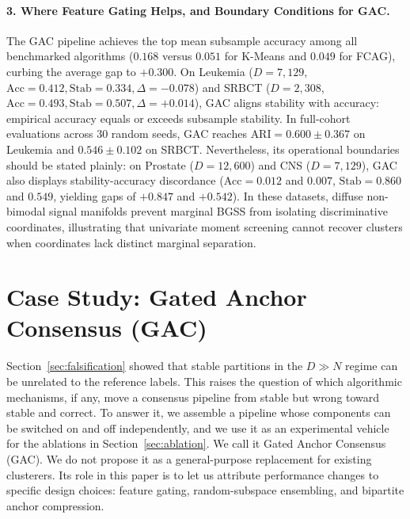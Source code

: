\documentclass[pdflatex,sn-mathphys-num]{sn-jnl}
\theoremstyle{thmstyleone}
\theoremstyle{thmstyletwo}
\theoremstyle{thmstylethree}
\begin{document}
\paragraph{3. Where Feature Gating Helps, and Boundary Conditions for GAC.}
The GAC pipeline achieves the top mean subsample accuracy among all benchmarked algorithms ($0.168$ versus $0.051$ for K-Means and $0.049$ for FCAG), curbing the average gap to $+0.300$. On Leukemia ($D=7{,}129$, $\text{Acc} = 0.412, \text{Stab} = 0.334, \Delta = -0.078$) and SRBCT ($D=2{,}308$, $\text{Acc} = 0.493, \text{Stab} = 0.507, \Delta = +0.014$), GAC aligns stability with accuracy: empirical accuracy equals or exceeds subsample stability. In full-cohort evaluations across 30 random seeds, GAC reaches $\text{ARI} = 0.600 \pm 0.367$ on Leukemia and $0.546 \pm 0.102$ on SRBCT. Nevertheless, its operational boundaries should be stated plainly: on Prostate ($D=12{,}600$) and CNS ($D=7{,}129$), GAC also displays stability-accuracy discordance ($\text{Acc} = 0.012$ and $0.007$, $\text{Stab} = 0.860$ and $0.549$, yielding gaps of $\mathbf{+0.847}$ and $\mathbf{+0.542}$). In these datasets, diffuse non-bimodal signal manifolds prevent marginal BGSS from isolating discriminative coordinates, illustrating that univariate moment screening cannot recover clusters when coordinates lack distinct marginal separation.

\section{Case Study: Gated Anchor Consensus (GAC)}\label{sec:methodology}\label{sec:methods}

Section~\ref{sec:falsification} showed that stable partitions in the $D \gg N$ regime can be unrelated to the reference labels. This raises the question of which algorithmic mechanisms, if any, move a consensus pipeline from stable but wrong toward stable and correct. To answer it, we assemble a pipeline whose components can be switched on and off independently, and we use it as an experimental vehicle for the ablations in Section~\ref{sec:ablation}. We call it Gated Anchor Consensus (GAC). We do not propose it as a general-purpose replacement for existing clusterers. Its role in this paper is to let us attribute performance changes to specific design choices: feature gating, random-subspace ensembling, and bipartite anchor compression.
\end{document}

